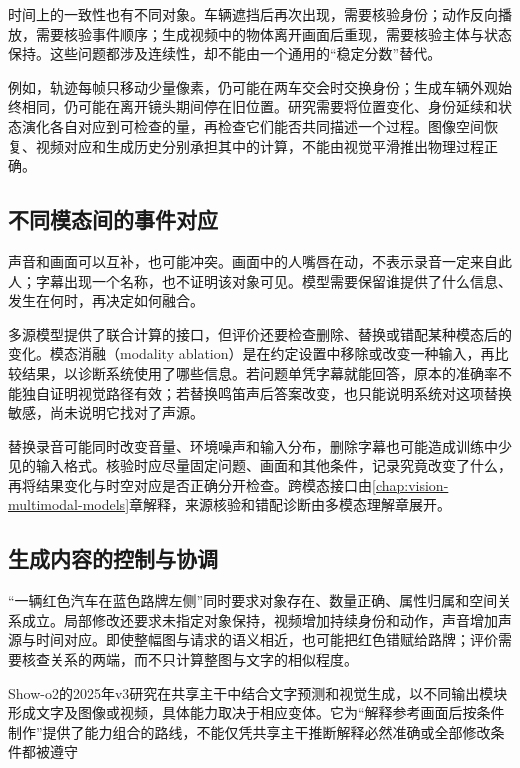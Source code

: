 时间上的一致性也有不同对象。车辆遮挡后再次出现，需要核验身份；动作反向播放，需要核验事件顺序；生成视频中的物体离开画面后重现，需要核验主体与状态保持。这些问题都涉及连续性，却不能由一个通用的“稳定分数”替代。

例如，轨迹每帧只移动少量像素，仍可能在两车交会时交换身份；生成车辆外观始终相同，仍可能在离开镜头期间停在旧位置。研究需要将位置变化、身份延续和状态演化各自对应到可检查的量，再检查它们能否共同描述一个过程。图像空间恢复、视频对应和生成历史分别承担其中的计算，不能由视觉平滑推出物理过程正确。

\subsection{不同模态间的事件对应}
\label{sec:vision-overview-alignment-frontier}

声音和画面可以互补，也可能冲突。画面中的人嘴唇在动，不表示录音一定来自此人；字幕出现一个名称，也不证明该对象可见。模型需要保留谁提供了什么信息、发生在何时，再决定如何融合。

多源模型提供了联合计算的接口，但评价还要检查删除、替换或错配某种模态后的变化。模态消融（modality ablation）是在约定设置中移除或改变一种输入，再比较结果，以诊断系统使用了哪些信息。若问题单凭字幕就能回答，原本的准确率不能独自证明视觉路径有效；若替换鸣笛声后答案改变，也只能说明系统对这项替换敏感，尚未说明它找对了声源。

替换录音可能同时改变音量、环境噪声和输入分布，删除字幕也可能造成训练中少见的输入格式。核验时应尽量固定问题、画面和其他条件，记录究竟改变了什么，再将结果变化与时空对应是否正确分开检查。跨模态接口由\ref{chap:vision-multimodal-models}章解释，来源核验和错配诊断由多模态理解章展开。

\subsection{生成内容的控制与协调}
\label{sec:vision-overview-generation-frontier}

“一辆红色汽车在蓝色路牌左侧”同时要求对象存在、数量正确、属性归属和空间关系成立。局部修改还要求未指定对象保持，视频增加持续身份和动作，声音增加声源与时间对应。即使整幅图与请求的语义相近，也可能把红色错赋给路牌；评价需要核查关系的两端，而不只计算整图与文字的相似程度。

Show-o2的2025年v3研究在共享主干中结合文字预测和视觉生成，以不同输出模块形成文字及图像或视频，具体能力取决于相应变体。它为“解释参考画面后按条件制作”提供了能力组合的路线，不能仅凭共享主干推断解释必然准确或全部修改条件都被遵守

